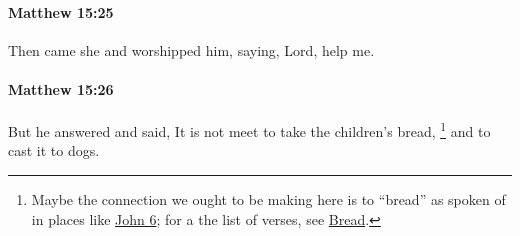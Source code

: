 		\paragraph{Matthew 15:25} %
			\label{MATTHEW-15-25}

			Then came she and worshipped him, saying, Lord, help me.

			\begin{framed}
			\scriptsize
				\begin{compactdesc}
					\item[SBLG] 
				\end{compactdesc}
			\end{framed}

		\paragraph{Matthew 15:26} %
			\label{MATTHEW-15-26}

			But he answered and said, It is not meet to take the children's bread,%
				\footnote{%
					Maybe the connection we ought to be making here is to ``bread'' as spoken of in places like \hyperref[JOHN-6]{John 6}; for a the list of verses, see \hyperref[BREAD]{Bread}.
					}
			and to cast it to dogs.

